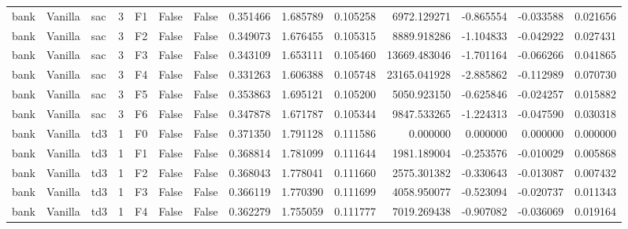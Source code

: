 \begin{tabular}{lllrlllrrrrrrr}
      bank & Vanilla &       sac &     3 &  F1 &           False &            False &  0.351466 &  1.685789 & 0.105258 &      6972.129271 &          -0.865554 &       -0.033588 &            0.021656 \\
      bank & Vanilla &       sac &     3 &  F2 &           False &            False &  0.349073 &  1.676455 & 0.105315 &      8889.918286 &          -1.104833 &       -0.042922 &            0.027431 \\
      bank & Vanilla &       sac &     3 &  F3 &           False &            False &  0.343109 &  1.653111 & 0.105460 &     13669.483046 &          -1.701164 &       -0.066266 &            0.041865 \\
      bank & Vanilla &       sac &     3 &  F4 &           False &            False &  0.331263 &  1.606388 & 0.105748 &     23165.041928 &          -2.885862 &       -0.112989 &            0.070730 \\
      bank & Vanilla &       sac &     3 &  F5 &           False &            False &  0.353863 &  1.695121 & 0.105200 &      5050.923150 &          -0.625846 &       -0.024257 &            0.015882 \\
      bank & Vanilla &       sac &     3 &  F6 &           False &            False &  0.347878 &  1.671787 & 0.105344 &      9847.533265 &          -1.224313 &       -0.047590 &            0.030318 \\
      bank & Vanilla &       td3 &     1 &  F0 &           False &            False &  0.371350 &  1.791128 & 0.111586 &         0.000000 &           0.000000 &        0.000000 &            0.000000 \\
      bank & Vanilla &       td3 &     1 &  F1 &           False &            False &  0.368814 &  1.781099 & 0.111644 &      1981.189004 &          -0.253576 &       -0.010029 &            0.005868 \\
      bank & Vanilla &       td3 &     1 &  F2 &           False &            False &  0.368043 &  1.778041 & 0.111660 &      2575.301382 &          -0.330643 &       -0.013087 &            0.007432 \\
      bank & Vanilla &       td3 &     1 &  F3 &           False &            False &  0.366119 &  1.770390 & 0.111699 &      4058.950077 &          -0.523094 &       -0.020737 &            0.011343 \\
      bank & Vanilla &       td3 &     1 &  F4 &           False &            False &  0.362279 &  1.755059 & 0.111777 &      7019.269438 &          -0.907082 &       -0.036069 &            0.019164 \\

\end{tabular}
